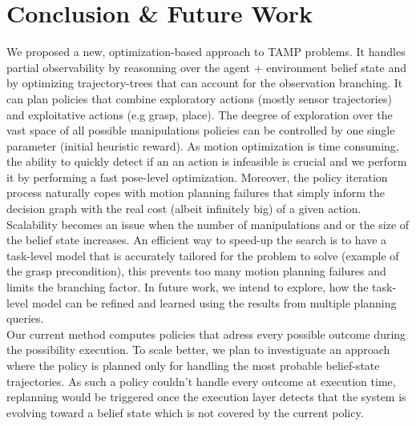 \documentclass[conference]{IEEEtran}
\begin{document}
\section{Conclusion \& Future Work}
We proposed a new, optimization-based approach to TAMP problems. It handles partial observability by reasonning over the agent + environment belief state and by optimizing trajectory-trees that can account for the observation branching. It can plan policies that combine exploratory actions (mostly sensor trajectories) and exploitative actions (e.g grasp, place). The deegree of exploration over the vast space of all possible manipulations policies can be controlled by one single parameter (initial heuristic reward). As motion optimization is time consuming, the ability to quickly detect if an an action is infeasible is crucial and we perform it by performing a fast pose-level optimization. Moreover, the policy iteration process naturally copes with motion planning failures that simply inform the decision graph with the real cost (albeit infinitely big) of a given action. Scalability becomes an issue when the number of manipulations and or the size of the belief state increases. An efficient way to speed-up the search is to have a task-level model that is accurately tailored for the problem to solve (example of the grasp precondition), this prevents too many motion planning failures and limits the branching factor. In future work, we intend to explore, how the task-level model can be refined and learned using the results from multiple planning queries.\\
Our current method computes policies that adress every possible outcome during the possibility execution. To scale better, we plan to investiguate an approach where the policy is planned only for handling the most probable belief-state trajectories. As such a policy couldn't handle every outcome at execution time, replanning would be triggered once the execution layer detects that the system is evolving toward a belief state which is not covered by the current policy.
\end{document}
